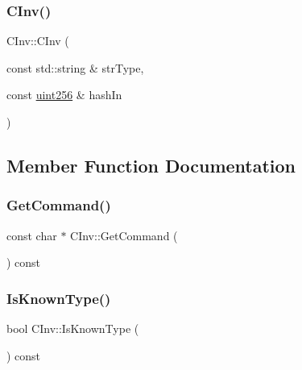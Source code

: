 \mbox{\label{class_c_inv_a412cb8fdd0bfe185f770fec91a3e13c4}} 
\subsubsection{\texorpdfstring{C\+Inv()}{CInv()}\hspace{0.1cm}{\footnotesize\ttfamily [3/3]}}
{\footnotesize\ttfamily C\+Inv\+::\+C\+Inv (\begin{DoxyParamCaption}\item[{const std\+::string \&}]{str\+Type,  }\item[{const \mbox{\hyperlink{classuint256}{uint256}} \&}]{hash\+In }\end{DoxyParamCaption})}



\subsection{Member Function Documentation}
\mbox{\label{class_c_inv_a29020c06b49edebfe9993adee93cf65a}} 
\subsubsection{\texorpdfstring{Get\+Command()}{GetCommand()}}
{\footnotesize\ttfamily const char $\ast$ C\+Inv\+::\+Get\+Command (\begin{DoxyParamCaption}{ }\end{DoxyParamCaption}) const}

\mbox{\label{class_c_inv_a3da7d96ce51443a1bfe8ce5342d0afbe}} 
\subsubsection{\texorpdfstring{Is\+Known\+Type()}{IsKnownType()}}
{\footnotesize\ttfamily bool C\+Inv\+::\+Is\+Known\+Type (\begin{DoxyParamCaption}{ }\end{DoxyParamCaption}) const}

\mbox{\label{class_c_inv_a7f56c1696e6c5c7ca36c1637f94dd1a0}} 
